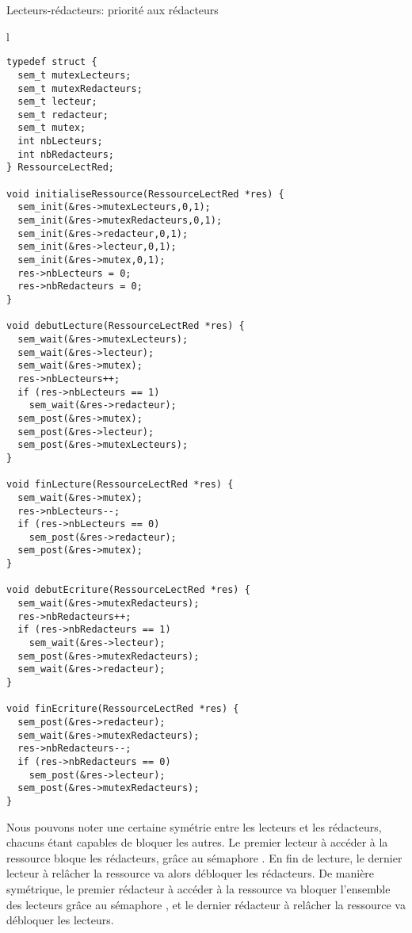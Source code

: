\begin{algorithm}[h!tp]
\caption{Lecteurs-rédacteurs: priorité aux rédacteurs}\label{lectred:prioriteredacteurs}
\begin{center}
\begin{tabular}{l}
\lstset{language=C++}
\begin{lstlisting}
typedef struct {
  sem_t mutexLecteurs;
  sem_t mutexRedacteurs;
  sem_t lecteur;
  sem_t redacteur;
  sem_t mutex;
  int nbLecteurs;
  int nbRedacteurs;
} RessourceLectRed;

void initialiseRessource(RessourceLectRed *res) {
  sem_init(&res->mutexLecteurs,0,1);
  sem_init(&res->mutexRedacteurs,0,1);
  sem_init(&res->redacteur,0,1);
  sem_init(&res->lecteur,0,1);
  sem_init(&res->mutex,0,1);
  res->nbLecteurs = 0;
  res->nbRedacteurs = 0;
}

void debutLecture(RessourceLectRed *res) {
  sem_wait(&res->mutexLecteurs);
  sem_wait(&res->lecteur);
  sem_wait(&res->mutex);
  res->nbLecteurs++;
  if (res->nbLecteurs == 1)
    sem_wait(&res->redacteur);
  sem_post(&res->mutex);
  sem_post(&res->lecteur);
  sem_post(&res->mutexLecteurs);
}

void finLecture(RessourceLectRed *res) {
  sem_wait(&res->mutex);
  res->nbLecteurs--;
  if (res->nbLecteurs == 0)
    sem_post(&res->redacteur);
  sem_post(&res->mutex);
}

void debutEcriture(RessourceLectRed *res) {
  sem_wait(&res->mutexRedacteurs);
  res->nbRedacteurs++;
  if (res->nbRedacteurs == 1)
    sem_wait(&res->lecteur);
  sem_post(&res->mutexRedacteurs);
  sem_wait(&res->redacteur);
}

void finEcriture(RessourceLectRed *res) {
  sem_post(&res->redacteur);
  sem_wait(&res->mutexRedacteurs);
  res->nbRedacteurs--;
  if (res->nbRedacteurs == 0)
    sem_post(&res->lecteur);
  sem_post(&res->mutexRedacteurs);
}
\end{lstlisting}
\end{tabular}
\end{center}
\end{algorithm}

Nous pouvons noter une certaine symétrie entre les lecteurs et les rédacteurs, chacuns étant capables de bloquer les autres. Le premier lecteur à accéder à la ressource bloque les rédacteurs, grâce au sémaphore . En fin de lecture, le dernier lecteur à relâcher la ressource va alors débloquer les rédacteurs. De manière symétrique, le premier rédacteur à accéder à la ressource va bloquer l'ensemble des lecteurs grâce au sémaphore , et le dernier rédacteur à relâcher la ressource va débloquer les lecteurs.

